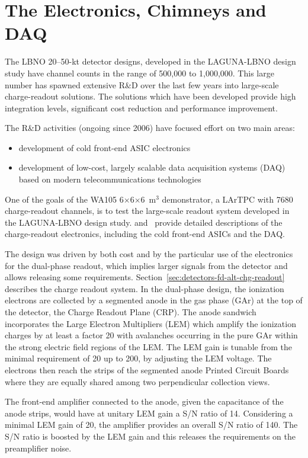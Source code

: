 \section{The Electronics, Chimneys and DAQ}
\label{sec:detectors-fd-alt-elec}

The LBNO 20--50-kt detector designs, developed in the LAGUNA-LBNO design study have channel counts in the range of 500,000 to 1,000,000. 
This large number has spawned extensive  R\&D over the last few years into large-scale charge-readout solutions.  The solutions which have been
developed provide  high integration levels, significant cost reduction and performance improvement.

The R\&D activities (ongoing since 2006) have focused effort on two main areas:
\begin {itemize} 
\item{development of cold front-end ASIC electronics}
\item{development of low-cost, largely scalable data 
acquisition systems (DAQ) based on modern telecommunications technologies}
\end{itemize}

One of the goals of the WA105 6$\times$6$\times$6~m$^3$ demonstrator, a LArTPC with \num{7680} charge-readout channels, is to test the large-scale readout system developed in the LAGUNA-LBNO design study. \anxdualtdr and~\cite{WA105_SREP} provide detailed
descriptions of the charge-readout electronics, including the cold front-end ASICs and the DAQ.

The design was driven by both cost and by the particular use of the electronics for the dual-phase readout, which implies larger signals from the detector and allows releasing some requirements. Section~\ref{sec:detectors-fd-alt-chg-readout} describes the charge readout system. In the dual-phase design, the ionization electrons are collected by a segmented anode in the gas phase (GAr) at the top of the detector, the Charge Readout Plane (CRP). The anode sandwich incorporates the Large Electron Multipliers (LEM) which amplify the ionization charges by at least a factor 20 with avalanches occurring
in the pure GAr within the strong electric field regions of the LEM.  The LEM gain is tunable from the minimal requirement of 20 up to 200, by adjusting the LEM voltage. The electrons then reach the strips of the segmented anode Printed Circuit Boards where they are equally shared among two perpendicular collection views. 

The front-end amplifier connected to the anode, given the capacitance of the anode strips, would have at unitary LEM gain a S/N ratio of
14. Considering a minimal LEM gain of 20, the amplifier provides an overall S/N ratio of 140. The S/N ratio is boosted by the LEM gain  and this releases the requirements on the preamplifier noise. 

